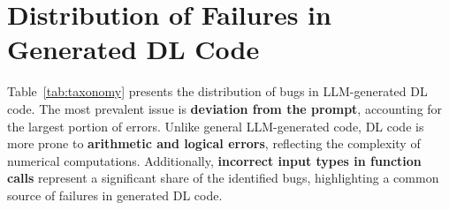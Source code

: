 \newpage
\section{Distribution of Failures in Generated DL Code}

Table~\ref{tab:taxonomy} presents the distribution of bugs in LLM-generated DL code. The most prevalent issue is \textbf{deviation from the prompt}, accounting for the largest portion of errors. Unlike general LLM-generated code, DL code is more prone to \textbf{arithmetic and logical errors}, reflecting the complexity of numerical computations. Additionally, \textbf{incorrect input types in function calls} represent a significant share of the identified bugs, highlighting a common source of failures in generated DL code.




%



